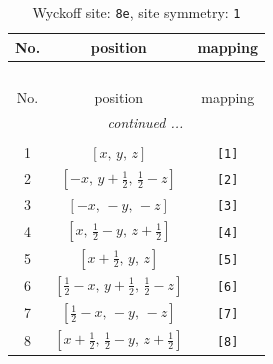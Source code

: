 \documentclass[fleqn,8pt]{jsarticle}
\begin{document}
\renewcommand{\arraystretch}{1.2}
\begin{longtable}{ccc}
\caption{Wyckoff site: {\tt 8e}, site symmetry: {\tt 1}}
 \\
 \hline \hline
No. & position & mapping \\ \hline \endfirsthead

\multicolumn{2}{l}{\tablename\ \thetable{}} \\
 \hline \hline
No. & position & mapping \\ \hline \endhead

 \hline \hline
\multicolumn{2}{r}{\footnotesize\it continued ...} \\ \endfoot

 \hline \hline
\multicolumn{2}{r}{} \\ \endlastfoot

1 & $\left[ x,\, y,\, z \right]$ & {\tt [1]} \\ \hline
2 & $\left[ - x,\, y + \frac{1}{2},\, \frac{1}{2} - z \right]$ & {\tt [2]} \\ \hline
3 & $\left[ - x,\, - y,\, - z \right]$ & {\tt [3]} \\ \hline
4 & $\left[ x,\, \frac{1}{2} - y,\, z + \frac{1}{2} \right]$ & {\tt [4]} \\ \hline
5 & $\left[ x + \frac{1}{2},\, y,\, z \right]$ & {\tt [5]} \\ \hline
6 & $\left[ \frac{1}{2} - x,\, y + \frac{1}{2},\, \frac{1}{2} - z \right]$ & {\tt [6]} \\ \hline
7 & $\left[ \frac{1}{2} - x,\, - y,\, - z \right]$ & {\tt [7]} \\ \hline
8 & $\left[ x + \frac{1}{2},\, \frac{1}{2} - y,\, z + \frac{1}{2} \right]$ & {\tt [8]} \\
\end{longtable}
\end{document}
